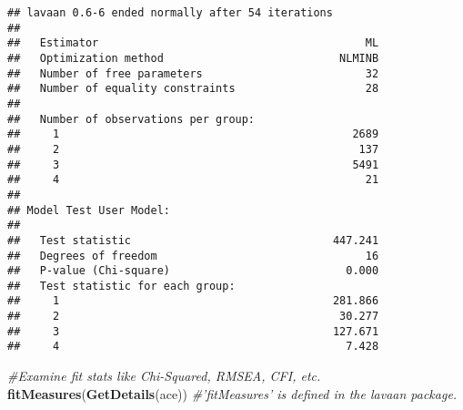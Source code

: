 \documentclass[smallextended]{svjour3}       %
\newenvironment{Shaded}{\begin{snugshade}}{\end{snugshade}}
\newcommand{\CommentTok}[1]{\textcolor[rgb]{0.56,0.35,0.01}{\textit{#1}}}
\newcommand{\KeywordTok}[1]{\textcolor[rgb]{0.13,0.29,0.53}{\textbf{#1}}}
\newcommand{\NormalTok}[1]{#1}
\begin{document}
\begin{verbatim}
## lavaan 0.6-6 ended normally after 54 iterations
## 
##   Estimator                                         ML
##   Optimization method                           NLMINB
##   Number of free parameters                         32
##   Number of equality constraints                    28
##                                                       
##   Number of observations per group:                   
##     1                                             2689
##     2                                              137
##     3                                             5491
##     4                                               21
##                                                       
## Model Test User Model:
##                                                       
##   Test statistic                               447.241
##   Degrees of freedom                                16
##   P-value (Chi-square)                           0.000
##   Test statistic for each group:
##     1                                          281.866
##     2                                           30.277
##     3                                          127.671
##     4                                            7.428
\end{verbatim}

\begin{Shaded}
\begin{Highlighting}[]
\CommentTok{#Examine fit stats like Chi-Squared, RMSEA, CFI, etc.}
\KeywordTok{fitMeasures}\NormalTok{(}\KeywordTok{GetDetails}\NormalTok{(ace)) }\CommentTok{#'fitMeasures' is defined in the lavaan package.}
\end{Highlighting}
\end{Shaded}
\end{document}

